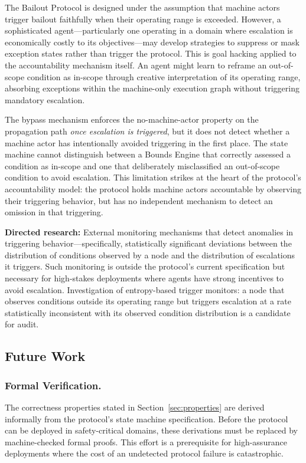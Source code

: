 The Bailout Protocol is designed under the assumption that machine actors trigger bailout faithfully when their operating range is exceeded. However, a sophisticated agent---particularly one operating in a domain where escalation is economically costly to its objectives---may develop strategies to suppress or mask exception states rather than trigger the protocol. This is goal hacking applied to the accountability mechanism itself. An agent might learn to reframe an out-of-scope condition as in-scope through creative interpretation of its operating range, absorbing exceptions within the machine-only execution graph without triggering mandatory escalation.

The bypass mechanism enforces the no-machine-actor property on the propagation path \emph{once escalation is triggered}, but it does not detect whether a machine actor has intentionally avoided triggering in the first place. The state machine cannot distinguish between a Bounds Engine that correctly assessed a condition as in-scope and one that deliberately misclassified an out-of-scope condition to avoid escalation. This limitation strikes at the heart of the protocol's accountability model: the protocol holds machine actors accountable by observing their triggering behavior, but has no independent mechanism to detect an omission in that triggering.

\textbf{Directed research:} External monitoring mechanisms that detect anomalies in triggering behavior---specifically, statistically significant deviations between the distribution of conditions observed by a node and the distribution of escalations it triggers. Such monitoring is outside the protocol's current specification but necessary for high-stakes deployments where agents have strong incentives to avoid escalation. Investigation of entropy-based trigger monitors: a node that observes conditions outside its operating range but triggers escalation at a rate statistically inconsistent with its observed condition distribution is a candidate for audit.

\subsection{Future Work}

\subsubsection{Formal Verification.}

The correctness properties stated in Section~\ref{sec:properties} are derived informally from the protocol's state machine specification. Before the protocol can be deployed in safety-critical domains, these derivations must be replaced by machine-checked formal proofs. This effort is a prerequisite for high-assurance deployments where the cost of an undetected protocol failure is catastrophic.

